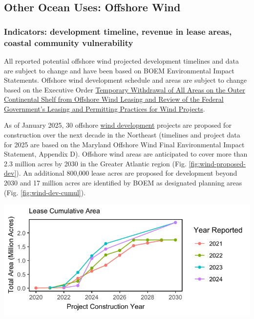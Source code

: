 \documentclass[
  10pt,
]{article}
\let\origfigure\figure
\let\endorigfigure\endfigure
\renewenvironment{figure}[1][2] {
    \expandafter\origfigure\expandafter[H]
} {
    \endorigfigure
}
\begin{document}
\subsection{Other Ocean Uses: Offshore Wind}\label{other-ocean-uses-offshore-wind}

\subsubsection{Indicators: development timeline, revenue in lease areas, coastal community vulnerability}\label{indicators-development-timeline-revenue-in-lease-areas-coastal-community-vulnerability}

All reported potential offshore wind projected development timelines and data are subject to change and have been based on BOEM Environmental Impact Statements. Offshore wind development schedule and areas are subject to change based on the Executive Order \href{https://www.whitehouse.gov/presidential-actions/2025/01/temporary-withdrawal-of-all-areas-on-the-outer-continental-shelf-from-offshore-wind-leasing-and-review-of-the-federal-governments-leasing-and-permitting-practices-for-wind-projects/}{Temporary Withdrawal of All Areas on the Outer Continental Shelf from Offshore Wind Leasing and Review of the Federal Government's Leasing and Permitting Practices for Wind Projects}.

As of January 2025, 30 offshore \href{https://noaa-edab.github.io/catalog/wind_dev_speed.html}{wind development} projects are proposed for construction over the next decade in the Northeast (timelines and project data for 2025 are based on the Maryland Offshore Wind Final Environmental Impact Statement, Appendix D). Offshore wind areas are anticipated to cover more than 2.3 million acres by 2030 in the Greater Atlantic region (Fig. \ref{fig:wind-proposed-dev}). An additional 800,000 lease acres are proposed for development beyond 2030 and 17 million acres are identified by BOEM as designated planning areas (Fig. \ref{fig:wind-dev-cumul}).

\begin{figure}

{\centering \includegraphics{midatlantic_files/figure-latex/wind-proposed-dev-1} 

}

\caption{Total area proposed for wind develpment on the northeast shelf through 2030.}\label{fig:wind-proposed-dev}
\end{figure}
\end{document}
